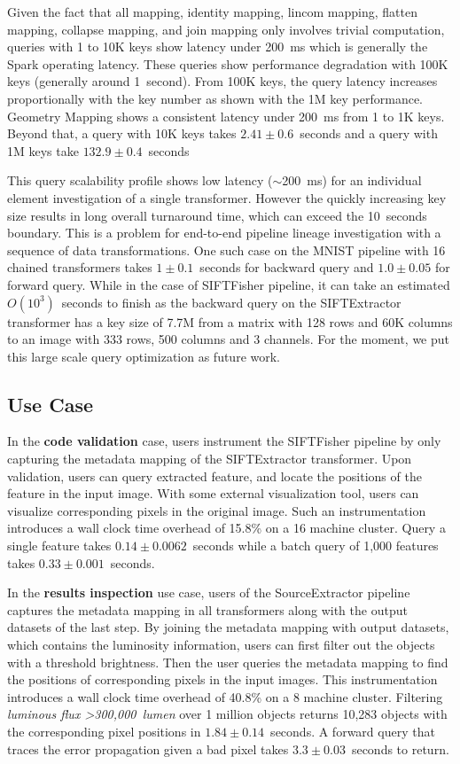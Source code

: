 \documentclass{sig-alternate}
\begin{document}
Given the fact that all mapping, identity mapping, lincom mapping, flatten mapping, collapse mapping, and join mapping
only involves trivial computation, queries with 1 to 10K keys show latency under 200~ms which is generally the Spark operating latency. 
These queries show performance degradation with 100K keys (generally around 1~second). 
From 100K keys, the query latency increases proportionally with the key number as shown with the 1M key performance.
Geometry Mapping shows a consistent latency under 200~ms from 1 to 1K keys. 
Beyond that, a query with 10K keys takes $2.41\pm0.6$~seconds and a query with 1M keys take $132.9\pm0.4$~seconds

This query scalability profile shows low latency ($\sim$200~ms) for an individual element investigation of a single transformer. 
However the quickly increasing key size results in long overall turnaround time, which can exceed the 10~seconds boundary. 
This is a problem for end-to-end pipeline lineage investigation with a sequence of data transformations.
One such case on the MNIST pipeline with 16 chained transformers takes $1\pm0.1$~seconds for backward query and $1.0\pm0.05$ for forward query.
While in the case of SIFTFisher pipeline,  it can take an estimated $O(10^3)$~seconds to finish as the backward query on the SIFTExtractor
transformer has a key size of 7.7M from a matrix with 128 rows and 60K columns to an image with 333 rows, 500 columns and 3 channels. 
For the moment, we put this large scale query optimization as future work.

\subsection{Use Case}
In the {\bf code validation} case, users instrument the SIFTFisher pipeline by only capturing the metadata mapping of the SIFTExtractor transformer.
Upon validation, users can query extracted feature, and locate the positions of the feature in the input image. With some external visualization tool,
users can visualize corresponding pixels in the original image. Such an instrumentation introduces a wall clock time overhead of 15.8\% on a 16 machine 
cluster.
Query a single feature takes $0.14\pm0.0062$~seconds while a batch query of 1,000 features takes $0.33\pm0.001$~seconds.

In the {\bf results inspection} use case, users of the SourceExtractor pipeline captures the metadata mapping in all transformers along with the output 
datasets of the last step. By joining the metadata mapping with output datasets, which contains the luminosity information, users can first filter out the
objects with a threshold brightness. Then the user queries the metadata mapping to find the positions of corresponding pixels in the input images.
This instrumentation introduces a wall clock time overhead of 40.8\% on a 8 machine cluster. 
Filtering {\it luminous flux >300,000~lumen} over 1 million objects returns 10,283 objects
with the corresponding pixel positions in $1.84\pm0.14$~seconds. 
A forward query that traces the error propagation given a bad pixel takes $3.3\pm0.03$~seconds to return.
\end{document}
